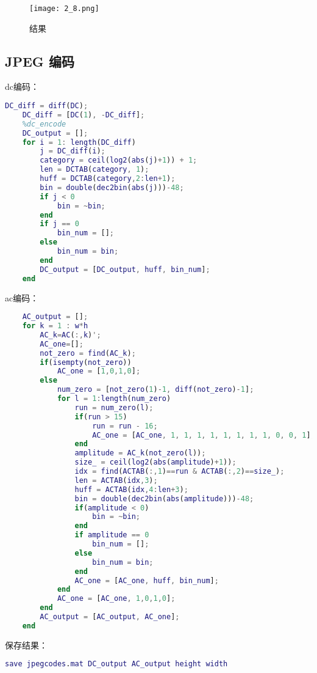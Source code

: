 \documentclass[12pt]{article}
\begin{document}
\begin{figure}[H]
    \centering
    \texttt{[image: 2\_8.png]}
    \caption{结果}
\end{figure}

\subsection{JPEG 编码}
dc编码：
\begin{lstlisting}[language=matlab]
    DC_diff = diff(DC);
    DC_diff = [DC(1), -DC_diff];
    %dc_encode
    DC_output = [];
    for i = 1: length(DC_diff)
        j = DC_diff(i);
        category = ceil(log2(abs(j)+1)) + 1;
        len = DCTAB(category, 1);
        huff = DCTAB(category,2:len+1);
        bin = double(dec2bin(abs(j)))-48;
        if j < 0
            bin = ~bin;
        end
        if j == 0
            bin_num = [];
        else
            bin_num = bin;
        end
        DC_output = [DC_output, huff, bin_num];
    end
\end{lstlisting}

ac编码：
\begin{lstlisting}[language=matlab]
    %ac_encode
    AC_output = [];
    for k = 1 : w*h
        AC_k=AC(:,k)';   
        AC_one=[];
        not_zero = find(AC_k);
        if(isempty(not_zero))
            AC_one = [1,0,1,0];
        else
            num_zero = [not_zero(1)-1, diff(not_zero)-1];
            for l = 1:length(num_zero)
                run = num_zero(l);
                if(run > 15)
                    run = run - 16;
                    AC_one = [AC_one, 1, 1, 1, 1, 1, 1, 1, 1, 0, 0, 1];
                end
                amplitude = AC_k(not_zero(l));
                size_ = ceil(log2(abs(amplitude)+1));
                idx = find(ACTAB(:,1)==run & ACTAB(:,2)==size_);
                len = ACTAB(idx,3);
                huff = ACTAB(idx,4:len+3);
                bin = double(dec2bin(abs(amplitude)))-48;
                if(amplitude < 0)
                    bin = ~bin;
                end
                if amplitude == 0
                    bin_num = [];
                else
                    bin_num = bin;
                end
                AC_one = [AC_one, huff, bin_num];
            end
            AC_one = [AC_one, 1,0,1,0];
        end
        AC_output = [AC_output, AC_one];
    end
\end{lstlisting}

保存结果：
\begin{lstlisting}[language=matlab]
    save jpegcodes.mat DC_output AC_output height width
\end{lstlisting}
\end{document}
